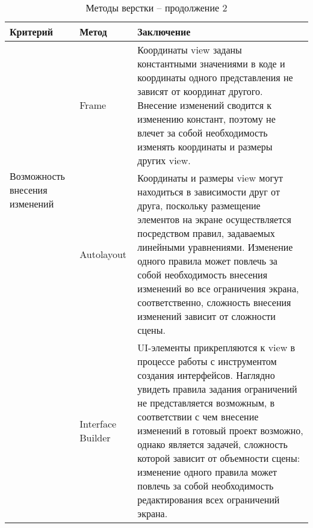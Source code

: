 \begin{table}[H]
	\centering
	\caption{Методы верстки -- продолжение 2}
	\label{mko_table_0}
	\begin{tabular}{|p{2.9cm}|p{2.9cm}|p{9.5cm}|}
		\hline
		\textbf{Критерий} & \textbf{Метод} & \textbf{Заключение} \\
		\hline
		\multirow{2}{2.9cm}{Возможность внесения изменений} & Frame & 
		Координаты view заданы константными значениями в коде и координаты одного представления не зависят от координат другого. 
		Внесение изменений сводится к изменению констант, поэтому не влечет за собой необходимость изменять координаты и размеры других view.\\
		\cline{2-3} & Autolayout & 
		Координаты и размеры view могут находиться в зависимости друг от друга, поскольку размещение элементов на экране 
		осуществляется посредством правил, задаваемых линейными уравнениями. 
		Изменение одного правила может повлечь за собой необходимость внесения изменений во все ограничения экрана, соответственно, сложность внесения изменений
		зависит от сложности сцены.\\
		\cline{2-3} & Interface Builder & 
		UI-элементы прикрепляются к view в процессе работы с инструментом создания интерфейсов. Наглядно увидеть правила задания ограничений не представляется возможным, 
		в соответствии с чем внесение изменений в готовый проект возможно, однако является задачей, сложность которой зависит от объемности сцены: изменение одного правила может 
		повлечь за собой необходимость редактирования всех ограничений экрана.\\
		\hline
	\end{tabular}
\end{table}

